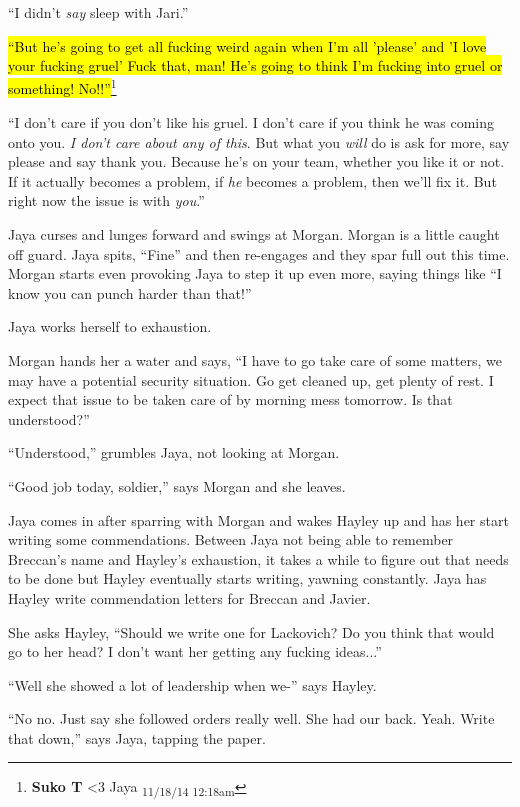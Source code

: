 ``I didn't \textit{say} sleep with Jari.''

\hl{``But he's going to get all fucking weird again when I'm all 'please' and 'I love your fucking gruel'  Fuck that, man!  He's going to think I'm fucking into gruel or something!  No!!''}\footnote{\textbf{Suko T }\textless 3 Jaya \textsubscript{11/18/14 12:18am}}

``I don't care if you don't like his gruel.  I don't care if you think he was coming onto you.  \textit{I don't care about any of this}.  But what you \textit{will} do is ask for more, say please and say thank you.  Because he's on your team, whether you like it or not.  If it actually becomes a problem, if \textit{he} becomes a problem, then we'll fix it.  But right now the issue is with \textit{you}.''

Jaya curses and lunges forward and swings at Morgan.  Morgan is a little caught off guard.  Jaya spits, ``Fine'' and then re-engages and they spar full out this time.  Morgan starts even provoking Jaya to step it up even more, saying things like ``I know you can punch harder than that!''

Jaya works herself to exhaustion.  



Morgan hands her a water and says, ``I have to go take care of some matters, we may have a potential security situation.  Go get cleaned up, get plenty of rest.  I expect that issue to be taken care of by morning mess tomorrow.  Is that understood?''

``Understood,'' grumbles Jaya, not looking at Morgan.

``Good job today, soldier,'' says Morgan and she leaves.





Jaya comes in after sparring with Morgan and wakes Hayley up and has her start writing some commendations.  Between Jaya not being able to remember Breccan's name and Hayley's exhaustion, it takes a while to figure out that needs to be done but Hayley eventually starts writing, yawning constantly.  Jaya has Hayley write commendation letters for Breccan and Javier.

She asks Hayley, ``Should we write one for Lackovich?  Do you think that would go to her head?  I don't want her getting any fucking ideas...''

``Well she showed a lot of leadership when we-'' says Hayley.

``No no.  Just say she followed orders really well.  She had our back.  Yeah. Write that down,'' says Jaya, tapping the paper.


